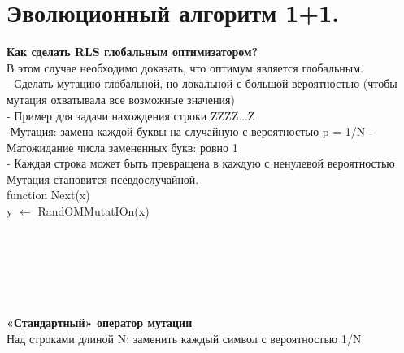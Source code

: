 \newcommand\tab[1][1cm]{\hspace*{#1}}
\section{Эволюционный алгоритм 1+1.}

\textbf{Как сделать RLS глобальным оптимизатором?}\\
В этом случае необходимо доказать, что оптимум является глобальным. \\
- Сделать мутацию глобальной, но локальной с большой вероятностью (чтобы мутация охватывала все возможные значения)\\
- Пример для задачи нахождения строки ZZZZ...Z \\
-Мутация: замена каждой буквы на случайную с вероятностью p = 1/N - Матожидание числа замененных букв: ровно 1 \\
- Каждая строка может быть превращена в каждую с ненулевой вероятностью \\
Мутация становится псевдослучайной.\\
function Next(x)  \\
y $\leftarrow$ RandOMMutatIOn(x)  \\
\tab {if f (y) $\ge$ f (x) then} \\ 
\tab \tab {} \\
\tab {} \\
\tab {}  \\
 \\
\\
\textbf{«Стандартный» оператор мутации}\\
Над строками длиной N: заменить каждый символ с вероятностью 1/N \\

